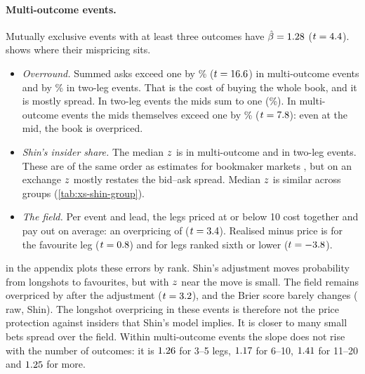 \paragraph{Multi-outcome events.}
Mutually exclusive events with at least three outcomes have $\hat\beta=1.28$
($t=4.4$).  shows where their mispricing sits.
\begin{itemize}
\item \emph{Overround.} Summed asks exceed one by \xsMeMultiOverAsk\% ($t=16.6$) in
      multi-outcome events and by \xsMeTwoOverAsk\% in two-leg events. That is the cost of buying the
      whole book, and it is mostly spread. In two-leg events the mids sum to one (\xsMeTwoOverMid\%).
      In multi-outcome events the mids themselves exceed one by \xsMeMultiOverMid\%
      ($t=7.8$): even at the mid, the book is overpriced.
\item \emph{Shin's insider share.} The median $z$ is \xsMeMultiZMedian{} in multi-outcome and
      \xsMeTwoZMedian{} in two-leg events. These are of the same order as estimates for bookmaker
      markets \citep{shin1993}, but on an exchange $z$ mostly restates the bid--ask spread.
      Median $z$ is similar across groups (\cref{tab:xs-shin-group}).
\item \emph{The field.} Per event and lead, the legs priced at or below 10\cents{} cost
      \xsMeMultiFieldPrice\cents{} together and pay out \xsMeMultiFieldWin\cents{} on average: an
      overpricing of \xsMeMultiFieldGap\cents{} ($t=3.4$). Realised minus price is
      \xsMeMultiRankOneEmid\cents{} for the favourite leg ($t=0.8$) and
      \xsMeMultiRankSixEmid\cents{} for legs ranked sixth or lower ($t=-3.8$).
\end{itemize}
 in the appendix plots these errors by rank.
Shin's adjustment moves probability from longshots to favourites, but with $z$ near
\xsMeMultiZMedian{} the move is small. The field remains overpriced by \xsMeMultiFieldShinGap\cents{}
after the adjustment ($t=3.2$), and the Brier score barely changes
(\xsMeMultiBrierMid{} raw, \xsMeMultiBrierShin{} Shin). The longshot overpricing in these events is
therefore not the price protection against insiders that Shin's model implies. It is closer to many
small bets spread over the field. Within multi-outcome events the slope does not rise with the number
of outcomes: it is $1.26$ for 3--5 legs, $1.17$ for 6--10,
$1.41$ for 11--20 and $1.25$ for more.

